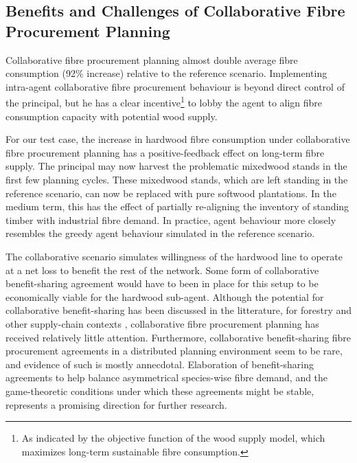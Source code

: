 \subsection{Benefits and Challenges of Collaborative Fibre Procurement Planning}

Collaborative fibre procurement planning almost double average fibre consumption (92\% increase) relative to the reference scenario. 
Implementing intra-agent collaborative fibre procurement behaviour is beyond direct control of the principal, but he has a clear incentive\footnote{As indicated by the objective function of the wood supply model, which maximizes long-term sustainable fibre consumption.} to lobby the agent to align fibre consumption capacity with potential wood supply. 

For our test case, the increase in hardwood fibre consumption under collaborative fibre procurement planning has a positive-feedback effect on long-term fibre supply. The principal may now harvest the problematic mixedwood stands in the first few planning cycles. These mixedwood stands, which are left standing in the reference scenario, can now be replaced with pure softwood plantations. In the medium term, this has the effect of partially re-aligning the inventory of standing timber with industrial fibre demand. In practice, agent behaviour more closely resembles the greedy agent behaviour simulated in the reference scenario.

The collaborative scenario simulates willingness of the hardwood line to operate at a net loss to benefit the rest of the network.
Some form of collaborative benefit-sharing agreement would have to been in place for this setup to be economically viable for the hardwood sub-agent. Although the potential for collaborative benefit-sharing has been discussed in the litterature, for forestry and other supply-chain contexts \citep{audy2012framework, lehoux2011collaboration, forget2008collaborative, dudek2005negotiation, frisk2010cost, guan2011study, beaudoin2010negotiation}, collaborative fibre procurement planning has received relatively little attention. 
Furthermore, collaborative benefit-sharing fibre procurement agreements in a distributed planning environment seem to be rare, and evidence of such is mostly annecdotal.
Elaboration of benefit-sharing agreements to help balance asymmetrical species-wise fibre demand, and the game-theoretic conditions under which these agreements might be stable, represents a promising direction for further research. 


